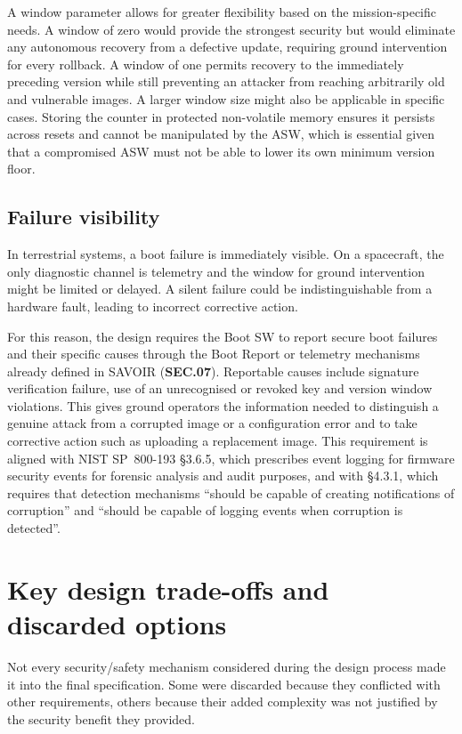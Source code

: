 A window parameter allows for greater flexibility based on the mission-specific needs. A window of zero would provide the strongest security but would eliminate any autonomous recovery from a defective update, requiring ground intervention for every rollback. A window of one permits recovery to the immediately preceding version while still preventing an attacker from reaching arbitrarily old and vulnerable images. A larger window size might also be applicable in specific cases. Storing the counter in protected non-volatile memory ensures it persists across resets and cannot be manipulated by the ASW, which is essential given that a compromised ASW must not be able to lower its own minimum version floor.

\subsection{Failure visibility}

In terrestrial systems, a boot failure is immediately visible. On a spacecraft, the only diagnostic channel is telemetry and the window for ground intervention might be limited or delayed. A silent failure could be indistinguishable from a hardware fault, leading to incorrect corrective action.

For this reason, the design requires the Boot SW to report secure boot failures and their specific causes through the Boot Report or telemetry mechanisms already defined in SAVOIR (\textbf{SEC.07}). Reportable causes include signature verification failure, use of an unrecognised or revoked key and version window violations. This gives ground operators the information needed to distinguish a genuine attack from a corrupted image or a configuration error and to take corrective action such as uploading a replacement image. This requirement is aligned with NIST SP~800-193 \cite{NIST-sp-800-193} §3.6.5, which prescribes event logging for firmware security events for forensic analysis and audit purposes, and with §4.3.1, which requires that detection mechanisms ``should be capable of creating notifications of corruption'' and ``should be capable of logging events when corruption is detected''.


\section{Key design trade-offs and discarded options}
\label{section:design-tradeoffs}

Not every security/safety mechanism considered during the design process made it into the final specification. Some were discarded because they conflicted with other requirements, others because their added complexity was not justified by the security benefit they provided.

